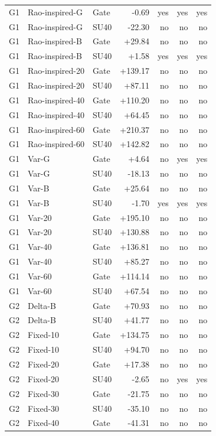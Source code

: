\begin{longtable}{lllrrrr}
G1 & Rao-inspired-G & Gate & -0.69 & yes & yes & yes \\
G1 & Rao-inspired-G & SU40 & -22.30 & no & no & no \\
G1 & Rao-inspired-B & Gate & +29.84 & no & no & no \\
G1 & Rao-inspired-B & SU40 & +1.58 & yes & yes & yes \\
G1 & Rao-inspired-20 & Gate & +139.17 & no & no & no \\
G1 & Rao-inspired-20 & SU40 & +87.11 & no & no & no \\
G1 & Rao-inspired-40 & Gate & +110.20 & no & no & no \\
G1 & Rao-inspired-40 & SU40 & +64.45 & no & no & no \\
G1 & Rao-inspired-60 & Gate & +210.37 & no & no & no \\
G1 & Rao-inspired-60 & SU40 & +142.82 & no & no & no \\
G1 & Var-G & Gate & +4.64 & no & yes & yes \\
G1 & Var-G & SU40 & -18.13 & no & no & no \\
G1 & Var-B & Gate & +25.64 & no & no & no \\
G1 & Var-B & SU40 & -1.70 & yes & yes & yes \\
G1 & Var-20 & Gate & +195.10 & no & no & no \\
G1 & Var-20 & SU40 & +130.88 & no & no & no \\
G1 & Var-40 & Gate & +136.81 & no & no & no \\
G1 & Var-40 & SU40 & +85.27 & no & no & no \\
G1 & Var-60 & Gate & +114.14 & no & no & no \\
G1 & Var-60 & SU40 & +67.54 & no & no & no \\
G2 & Delta-B & Gate & +70.93 & no & no & no \\
G2 & Delta-B & SU40 & +41.77 & no & no & no \\
G2 & Fixed-10 & Gate & +134.75 & no & no & no \\
G2 & Fixed-10 & SU40 & +94.70 & no & no & no \\
G2 & Fixed-20 & Gate & +17.38 & no & no & no \\
G2 & Fixed-20 & SU40 & -2.65 & no & yes & yes \\
G2 & Fixed-30 & Gate & -21.75 & no & no & no \\
G2 & Fixed-30 & SU40 & -35.10 & no & no & no \\
G2 & Fixed-40 & Gate & -41.31 & no & no & no \\

\end{longtable}
